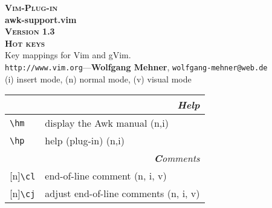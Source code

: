 \documentclass[oneside,10pt,landscape,DIV16]{scrartcl}
\newcommand{\Pluginversion}{1.3}
\newcommand{\Rep}{{\scriptsize{[n]}}}
\begin{document}
%

\begin{multicols}{3}
%
\begin{center}
%
\textbf{\textsc{\small{Vim-Plug-in}}}\\
\textbf{\LARGE{awk-support.vim}}\\
\textbf{\textsc{\small{Version \Pluginversion}}}\\
\vspace{1mm}%
\textbf{\textsc{\Huge{Hot keys}}}\\ 
\vspace{1mm}%
Key mappings for Vim and gVim.\\
{\tiny  \texttt{http://www.vim.org}\hspace{1.5mm}---\hspace{1.5mm}\textbf{Wolfgang Mehner},  \texttt{wolfgang-mehner@web.de}}\\
\vspace{1.0mm}
{\normalsize (i)} insert mode, {\normalsize (n)} normal mode, {\normalsize (v)} visual mode\\
\vspace{1.0mm}
%
\begin{tabular}[]{|p{11mm}|p{60mm}|}
\hline 
\multicolumn{2}{|r|}{\textsl{\textbf{H}elp}}\\[1.0ex]
\hline \verb'\hm'   & display the Awk manual                 \hfill (n,i)\\
\hline \verb'\hp'   & help (plug-in)                         \hfill (n,i)\\
\hline 
\hline
\multicolumn{2}{|r|}{\textsl{\textbf{C}omments}}                       \\[1.0ex]
\hline \Rep\verb'\cl'   & end-of-line comment               \hfill (n, i, v)\\
\hline \Rep\verb'\cj'   & adjust end-of-line comments       \hfill (n, i, v)\\

\end{tabular}
\end{center}
\end{multicols}
\end{document}

